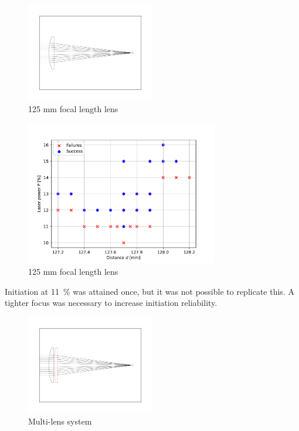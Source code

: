         \begin{figure}[!ht]
            \centering
            \includegraphics[width=0.5\textwidth]{assets/4 experiments/125lens.pdf}
            \caption{125 mm focal length lens}
        \end{figure}

        \begin{figure}[!ht]
            \centering
            \includegraphics[width=0.75\textwidth]{assets/4 experiments/125mm_focus_threshold.pdf}
            \caption{125 mm focal length lens}
        \end{figure}
        
        Initiation at \qty{11}{\%} was attained once, but it was not possible to replicate this. A tighter focus was necessary to increase initiation reliability.

        \begin{figure}[!ht]
            \centering
            \includegraphics[width=0.5\textwidth]{assets/4 experiments/500 and 150 lenses.pdf}
            \caption{Multi-lens system}
        \end{figure}

